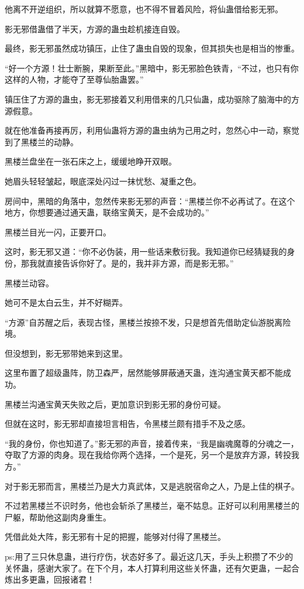 \begin{this_body}
他离不开逆组织，所以就算不愿意，也不得不冒着风险，将仙蛊借给影无邪。

影无邪借蛊借了半天，方源的蛊虫趁机接连自毁。

最终，影无邪虽然成功镇压，止住了蛊虫自毁的现象，但其损失也是相当的惨重。

“好一个方源！壮士断腕，果断至此。”黑暗中，影无邪脸色铁青，“不过，也只有你这样的人物，才能夺了至尊仙胎蛊罢。”

镇压住了方源的蛊虫，影无邪接着又利用借来的几只仙蛊，成功驱除了脑海中的方源假意。

就在他准备再接再厉，利用仙蛊将方源的蛊虫纳为己用之时，忽然心中一动，察觉到了黑楼兰的动静。

黑楼兰盘坐在一张石床之上，缓缓地睁开双眼。

她眉头轻轻皱起，眼底深处闪过一抹忧愁、凝重之色。

房间中，黑暗的角落中，忽然传来影无邪的声音：“黑楼兰你不必再试了。在这个地方，你想要通过通天蛊，联络宝黄天，是不会成功的。”

黑楼兰目光一闪，正要开口。

这时，影无邪又道：“你不必伪装，用一些话来敷衍我。我知道你已经猜疑我的身份，那我就直接告诉你好了。是的，我并非方源，而是影无邪。”

黑楼兰动容。

她可不是太白云生，并不好糊弄。

“方源”自苏醒之后，表现古怪，黑楼兰按捺不发，只是想首先借助定仙游脱离险境。

但没想到，影无邪带她来到这里。

这里布置了超级蛊阵，防卫森严，居然能够屏蔽通天蛊，连沟通宝黄天都不能成功。

黑楼兰沟通宝黄天失败之后，更加意识到影无邪的身份可疑。

但就在这时，影无邪却直接坦言相告，令黑楼兰颇有措手不及之感。

“我的身份，你也知道了。”影无邪的声音，接着传来，“我是幽魂魔尊的分魂之一，夺取了方源的肉身。现在我给你两个选择，一个是死，另一个是放弃方源，转投我方。”

对于影无邪而言，黑楼兰乃是大力真武体，又是逃脱宿命之人，乃是上佳的棋子。

不过若黑楼兰不识时务，他也会斩杀了黑楼兰，毫不姑息。正好可以利用黑楼兰的尸躯，帮助他这副肉身重生。

凭借此处大阵，影无邪有十足的把握，能够对付得了黑楼兰。

ps:用了三只休息蛊，进行疗伤，状态好多了。最近这几天，手头上积攒了不少的关怀蛊，感谢大家了。在下个月，本人打算利用这些关怀蛊，还有欠更蛊，一起合炼出多更蛊，回报诸君！

\end{this_body}

